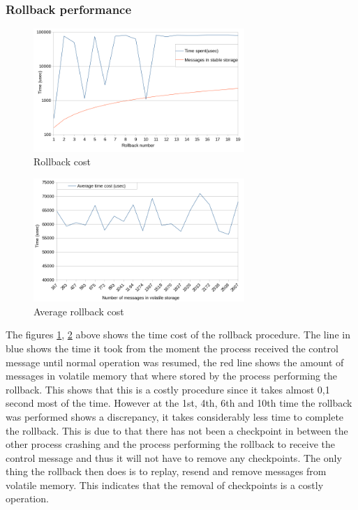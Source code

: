 \documentclass[twocolumn, a4paper,11pt]{article}%
\begin{document}
\subsubsection{Rollback performance}
\begin{figure}[h]
	\includegraphics[width=8cm]{rollback_timing_new.png}
	\caption{Rollback cost}
	\label{fig:rollback_cost}
\end{figure}
\begin{figure}[h]
	\includegraphics[width=8cm]{rollback_timing_average_new.png}
	\caption{Average rollback cost}
	\label{fig:average_rollback}
\end{figure}\noindent
The figures \ref{fig:rollback_cost}, \ref{fig:average_rollback} above shows the time cost of the rollback procedure. The line in blue shows the time it took from the moment the process received the control message until normal operation was resumed, the red line shows the amount of messages in volatile memory that where stored by the process performing the rollback. This shows that this is a costly procedure since it takes almost 0,1 second most of the time. However at the 1st, 4th, 6th and 10th time the rollback was performed shows a discrepancy, it takes considerably less time to complete the rollback. This is due to that there has not been a checkpoint in between the other process crashing and the process performing the rollback to receive the control message and thus it will not have to remove any checkpoints. The only thing the rollback then does is to replay, resend and remove messages from volatile memory. This indicates that the removal of checkpoints is a costly operation.
\end{document}
